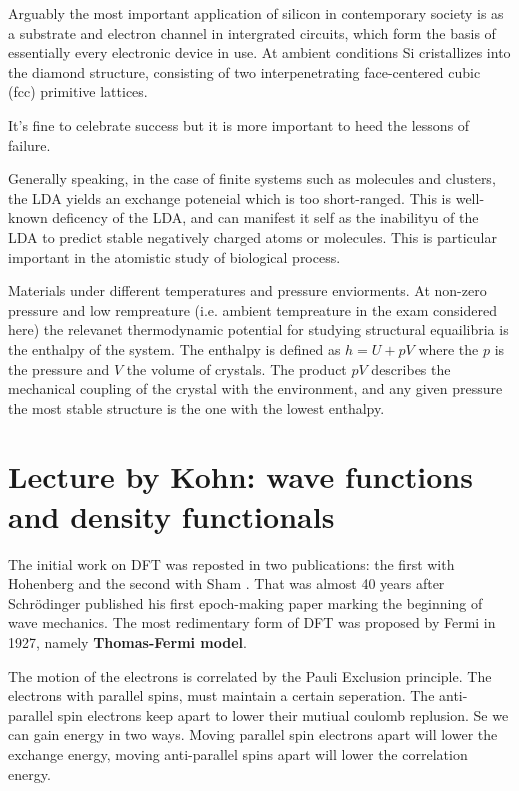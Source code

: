 \documentclass[a4paper, 11pt]{article}
\numberwithin{equation}{subsection}
\begin{document}
Arguably the most important application of silicon in contemporary society is as a substrate and electron channel in intergrated circuits, which form the basis of essentially every electronic device in use. At ambient conditions Si cristallizes into the diamond structure, consisting of two interpenetrating face-centered cubic (fcc) primitive lattices. 

It's fine to celebrate success but it is more important to heed the lessons of failure.

Generally speaking, in the case of finite systems such as molecules and clusters, the LDA yields an exchange poteneial which is too short-ranged. This is well-known deficency of the LDA, and can manifest it self as the inabilityu of the LDA to predict stable negatively charged atoms or molecules. This is particular important in the atomistic study of biological process.

Materials under different temperatures and pressure enviorments. At non-zero pressure and low rempreature (i.e. ambient tempreature in the exam considered here) the relevanet thermodynamic potential for studying structural equailibria is the enthalpy of the system. The enthalpy is defined as $h = U + pV$ where the $p$ is the pressure and $V$ the volume of crystals. The product $pV$ describes the mechanical coupling of the crystal with the environment, and any given pressure the most stable structure is the one with the lowest enthalpy.

\section{Lecture by Kohn: wave functions and density functionals}

The initial work on DFT was reposted in two publications: the first with Hohenberg \cite{hohenberg_inhomogeneous_1964} and the second with Sham \cite{kohn_self-consistent_1965}. That was almost 40 years after Schr{\"o}dinger published his first epoch-making paper marking the beginning of wave mechanics. The most redimentary form of DFT was proposed by Fermi in 1927, namely \textbf{Thomas-Fermi model}. 


The motion of the electrons is correlated by the Pauli Exclusion principle. The electrons with parallel spins, must maintain a certain seperation. The anti-parallel spin electrons keep apart to lower their mutiual coulomb replusion. Se we can gain energy in two ways. Moving parallel spin electrons apart will lower the exchange energy, moving anti-parallel spins apart will lower the correlation energy.
\end{document}
